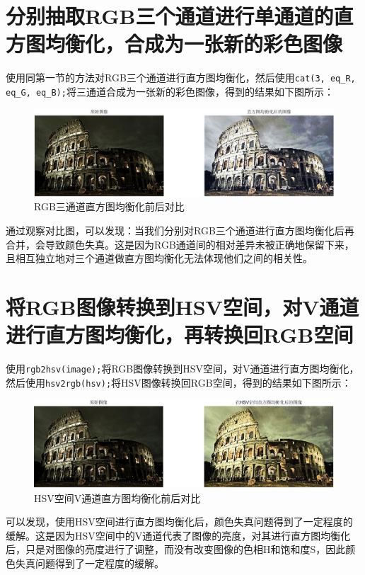 \documentclass[UTF8,a4paper,11pt]{ctexart}
\begin{document}
\section{分别抽取RGB三个通道进行单通道的直方图均衡化，合成为一张新的彩色图像}
使用同第一节的方法对RGB三个通道进行直方图均衡化，然后使用\verb|cat(3, eq_R, eq_G, eq_B);|将三通道合成为一张新的彩色图像，得到的结果如下图所示：
\begin{figure}[H]
	\centering
	\includegraphics[width=1\textwidth]{PA5_3.jpg}
	\caption{RGB三通道直方图均衡化前后对比}
\end{figure}

通过观察对比图，可以发现：当我们分别对RGB三个通道进行直方图均衡化后再合并，会导致颜色失真。这是因为RGB通道间的相对差异未被正确地保留下来，且相互独立地对三个通道做直方图均衡化无法体现他们之间的相关性。

\section{将RGB图像转换到HSV空间，对V通道进行直方图均衡化，再转换回RGB空间}
使用\verb|rgb2hsv(image);|将RGB图像转换到HSV空间，对V通道进行直方图均衡化，然后使用\verb|hsv2rgb(hsv);|将HSV图像转换回RGB空间，得到的结果如下图所示：

\begin{figure}[H]
	\centering
	\includegraphics[width=1\textwidth]{PA5_4.jpg}
	\caption{HSV空间V通道直方图均衡化前后对比}
\end{figure}

可以发现，使用HSV空间进行直方图均衡化后，颜色失真问题得到了一定程度的缓解。这是因为HSV空间中的V通道代表了图像的亮度，对其进行直方图均衡化后，只是对图像的亮度进行了调整，而没有改变图像的色相H和饱和度S，因此颜色失真问题得到了一定程度的缓解。
\end{document}

